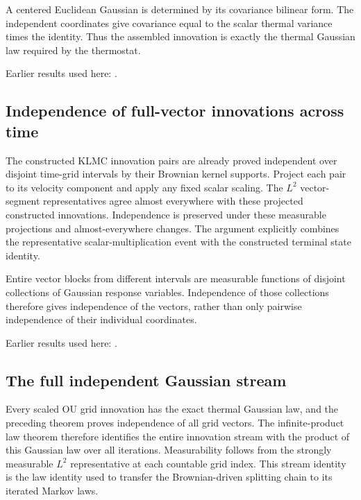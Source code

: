 \documentclass[11pt,a4paper]{report}
\begin{document}
A centered Euclidean Gaussian is determined by its covariance bilinear form. The independent coordinates give covariance equal to the scalar thermal variance times the identity. Thus the assembled innovation is exactly the thermal Gaussian law required by the thermostat.



Earlier results used here: \cite[Section~3.8.17]{LangevinLean2026ULASC}.
\subsection{\texorpdfstring{Independence of full-vector innovations across time}{Independence of full-vector innovations across time}}
\label{report-step-KineticLangevin-OUMarginal-lean-4}


The constructed KLMC innovation pairs are already proved independent over disjoint time-grid intervals by their Brownian kernel supports. Project each pair to its velocity component and apply any fixed scalar scaling. The \(L^{2}\) vector-segment representatives agree almost everywhere with these projected constructed innovations. Independence is preserved under these measurable projections and almost-everywhere changes. The argument explicitly combines the representative scalar-multiplication event with the constructed terminal state identity.



Entire vector blocks from different intervals are measurable functions of disjoint collections of Gaussian response variables. Independence of those collections therefore gives independence of the vectors, rather than only pairwise independence of their individual coordinates.



Earlier results used here: \cite[Section~3.8.17]{LangevinLean2026ULASC}.
\subsection{\texorpdfstring{The full independent Gaussian stream}{The full independent Gaussian stream}}
\label{report-step-KineticLangevin-OUMarginal-lean-5}


Every scaled OU grid innovation has the exact thermal Gaussian law, and the preceding theorem proves independence of all grid vectors. The infinite-product law theorem therefore identifies the entire innovation stream with the product of this Gaussian law over all iterations. Measurability follows from the strongly measurable \(L^{2}\) representative at each countable grid index. This stream identity is the law identity used to transfer the Brownian-driven splitting chain to its iterated Markov laws.
\end{document}
